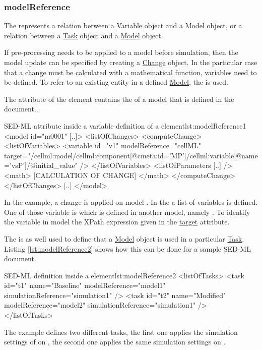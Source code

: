 \subsubsection{modelReference}
\label{sec:modelReference}
%
The  represents a relation between a \hyperref[class:variable]{Variable} object and a \hyperref[class:Model]{Model} object, or  a relation between a \hyperref[class:task]{Task} object and a \hyperref[class:Model]{Model} object.

If pre-processing needs to be applied to a model before simulation, then the model update can be specified by creating a \hyperref[class:Change]{Change} object. In the particular case that a change must be calculated with a mathematical function, variables need to be defined. To refer to an existing entity in a defined \hyperref[class:model]{Model}, the  is used. 

The  attribute of the  element contains the  of a model that is defined in the document.. 
%
\begin{myXmlLst}{SED-ML  attribute inside a variable definition of a   element}{lst:modelReference1}
<model id="m0001" [..]>
 <listOfChanges>
   <computeChange>
    <listOfVariables>
     <variable id="v1" modelReference="cellML" target="/cellml:model/cellml:component[@cmeta:id='MP']/cellml:variable[@name='vsP']/@initial_value" />
    </listOfVariables>
    <listOfParameters [..] />
    <math>
     [CALCULATION OF CHANGE]
    </math>
   </computeChange>
 </listOfChanges>
 [..]
</model>
\end{myXmlLst}
%
In the example, a change is  applied on model . In the  a list of variables is defined. One of those variable is  which is defined in another model, namely . To identify the variable in model  the XPath expression given in the \hyperref[sec:target]{target} attribute.

The  is as well used to define that a \hyperref[class:model]{Model} object is used in a particular  \hyperref[class:task]{Task}. Listing \ref{lst:modelReference2} shows how this can be done for a sample SED-ML document.
%
\begin{myXmlLst}{SED-ML  definition inside a  element}{lst:modelReference2}
<listOfTasks>
 <task id="t1" name="Baseline" modelReference="model1" simulationReference="simulation1" />
 <task id="t2" name="Modified" modelReference="model2" simulationReference="simulation1" />
</listOfTasks>
\end{myXmlLst}
%
The example defines two different tasks, the first one applies the simulation settings of  on , the second one applies the same simulation settings on .

